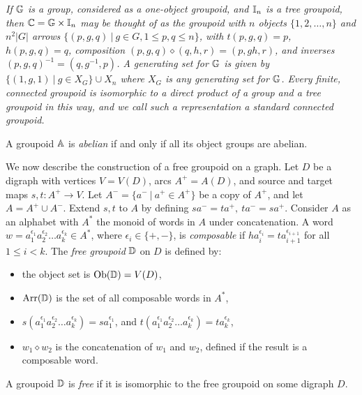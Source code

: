 \begin{example} \label{ex:gp-tree-gpd}
\emph{If $\mathbb{G}$ is a group, considered as a one-object groupoid, 
and $\mathbb{I}_n$ is a tree groupoid, then $\mathbb{C} = \mathbb{G} \times \mathbb{I}_n$ 
may be thought of as the groupoid with $n$ objects $\{1,2,\ldots,n\}$ 
and $n^2|G|$ arrows $\{(p,g,q) ~|~ g \in G, 1 \leqslant p,q \leqslant n\}$, 
with $t(p,g,q)=p$, $h(p,g,q)=q$, 
composition $(p,g,q)\diamond(q,h,r) = (p,gh,r)$, 
and inverses $(p,g,q)^{-1} = (q,g^{-1},p)$. 
A generating set for $\mathbb{G}$ is given by 
$\{(1,g,1) ~|~ g \in X_G\} \cup X_n$ 
where $X_G$ is any generating set for $\mathbb{G}$. 
Every finite, connected groupoid is isomorphic to a direct product 
of a group and a tree groupoid in this way, and we call such a 
representation a \emph{standard connected groupoid}.}
\end{example}

A groupoid $\mathbb{A}$ is \emph{abelian}   
if and only if all its object groups are abelian. 

\medskip
We now describe the construction of a free groupoid on a graph. 
Let $D$ be a digraph with vertices $V = V(D)$, arcs $A^+=A(D)$, 
and source and target maps $s,t : A^+ \to V$. 
Let $A^- = \{a^- ~|~ a^+ \in A^+\}$ be a copy of $A^+$, 
and let $A = A^+ \cup A^-$.  
Extend $s,t$ to $A$ by defining $sa^-=ta^+,~ ta^-=sa^+$. 
Consider $A$ as an alphabet with $A^*$ the monoid of words in $A$ 
under concatenation. 
A word $w=a_1^{\epsilon_1}a_2^{\epsilon_2} \ldots a_k^{\epsilon_k} \in A^*$, 
where $\epsilon_i \in \{+,-\}$, is \emph{composable} 
if $ha_i^{\epsilon_i} = ta_{i+1}^{\epsilon_{i+1}}$ 
for all $1 \leqslant i < k$. 
The \emph{free groupoid} $\mathbb{D}$ on $D$ is defined by: 
\begin{itemize} 
\item 
the object set is $\mathrm{Ob}(\mathbb{D}) = V(D)$,  
\item
$\mathrm{Arr}(\mathbb{D})$ is the set of all composable words in $A^*$, 
\item
$s(a_1^{\epsilon_1}a_2^{\epsilon_2} \ldots a_k^{\epsilon_k}) 
   = sa_1^{\epsilon_1}$, 
and $t(a_1^{\epsilon_1}a_2^{\epsilon_2} \ldots a_k^{\epsilon_k}) 
   = ta_k^{\epsilon_k}$, 
\item
$w_1 \diamond w_2$ is the concatenation of $w_1$ and $w_2$, 
defined if the result is a composable word.
\end{itemize} 
A groupoid $\mathbb{D}$ is \emph{free} if it is isomorphic to the free groupoid 
on some digraph $D$. 


